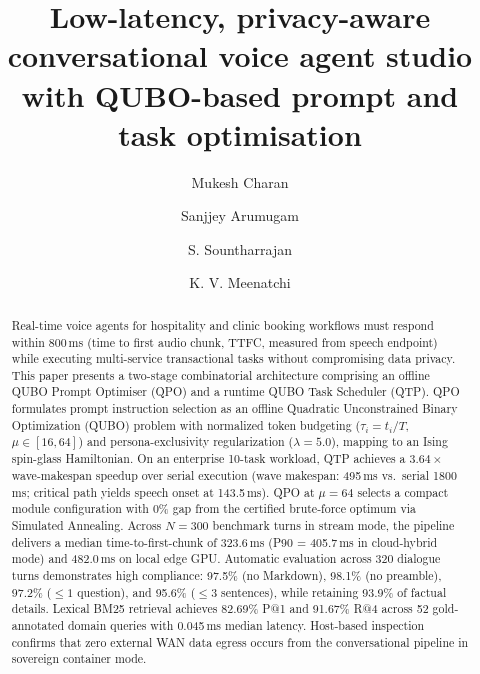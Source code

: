 \documentclass[review,12pt,times,authoryear]{elsarticle}
\theoremstyle{definition}
\begin{document}
\begin{frontmatter}


\title{Low-latency, privacy-aware conversational voice agent studio with QUBO-based prompt and task optimisation}

\author[a]{Mukesh Charan}
\author[a]{Sanjjey Arumugam}
\author[a]{S. Sountharrajan}
\author[a]{K. V. Meenatchi}


\begin{abstract}
Real-time voice agents for hospitality and clinic booking workflows must respond within 800\,ms (time to first audio chunk, TTFC, measured from speech endpoint) while executing multi-service transactional tasks without compromising data privacy. This paper presents a two-stage combinatorial architecture comprising an offline QUBO Prompt Optimiser (QPO) and a runtime QUBO Task Scheduler (QTP). QPO formulates prompt instruction selection as an offline Quadratic Unconstrained Binary Optimization (QUBO) problem with normalized token budgeting ($\tau_i = t_i / T$, $\mu \in [16, 64]$) and persona-exclusivity regularization ($\lambda = 5.0$), mapping to an Ising spin-glass Hamiltonian. On an enterprise 10-task workload, QTP achieves a $3.64\times$ wave-makespan speedup over serial execution (wave makespan: 495\,ms vs.\ serial 1800\,ms; critical path yields speech onset at 143.5\,ms). QPO at $\mu=64$ selects a compact module configuration with 0\% gap from the certified brute-force optimum via Simulated Annealing. Across $N=300$ benchmark turns in stream mode, the pipeline delivers a median time-to-first-chunk of 323.6\,ms (P90 = 405.7\,ms in cloud-hybrid mode) and 482.0\,ms on local edge GPU. Automatic evaluation across 320 dialogue turns demonstrates high compliance: 97.5\% (no Markdown), 98.1\% (no preamble), 97.2\% ($\le 1$ question), and 95.6\% ($\le 3$ sentences), while retaining 93.9\% of factual details. Lexical BM25 retrieval achieves 82.69\% P@1 and 91.67\% R@4 across 52 gold-annotated domain queries with 0.045\,ms median latency. Host-based inspection confirms that zero external WAN data egress occurs from the conversational pipeline in sovereign container mode.
\end{abstract}


\end{frontmatter}
\end{document}
